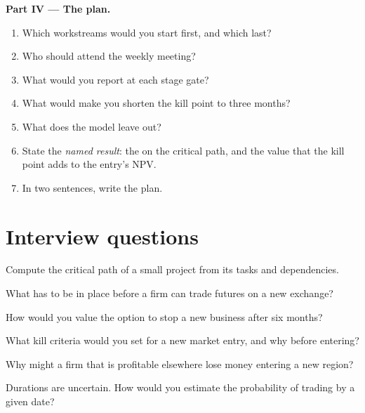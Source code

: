\begin{problem}
\medskip\noindent\textbf{Part IV --- The plan.}
\begin{enumerate}[resume]
\item Which workstreams would you start first, and which last?
\item Who should attend the weekly meeting?
\item What would you report at each stage gate?
\item What would make you shorten the kill point to three months?
\item What does the model leave out?
\item State the \emph{named result}: the  on the critical path, and the value that the kill point adds to the entry's NPV.
\item In two sentences, write the plan.
\end{enumerate}
\end{problem}

\section{Interview questions}

\begin{interviewq}\label{iq:fm:entering-a-new-market:1}
Compute the critical path of a small project from its tasks and dependencies.
\end{interviewq}

\begin{interviewq}\label{iq:fm:entering-a-new-market:2}
What has to be in place before a firm can trade futures on a new exchange?
\end{interviewq}

\begin{interviewq}\label{iq:fm:entering-a-new-market:3}
How would you value the option to stop a new business after six months?
\end{interviewq}

\begin{interviewq}\label{iq:fm:entering-a-new-market:4}
What kill criteria would you set for a new market entry, and why before entering?
\end{interviewq}

\begin{interviewq}\label{iq:fm:entering-a-new-market:5}
Why might a firm that is profitable elsewhere lose money entering a new region?
\end{interviewq}

\begin{interviewq}\label{iq:fm:entering-a-new-market:6}
Durations are uncertain. How would you estimate the probability of trading by a given date?
\end{interviewq}
